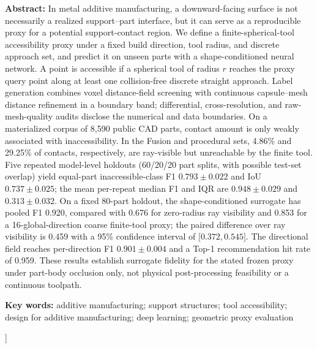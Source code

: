 \documentclass[UTF8,a4paper,twocolumn,zihao=5,fontset=fandol]{ctexart}
\begin{document}
\begin{@twocolumnfalse}
\begin{minipage}{\textwidth}
\vspace{0.45em}
\noindent\textbf{Abstract:}
In metal additive manufacturing, a downward-facing surface is not necessarily a realized support--part interface, but it can serve as a reproducible proxy for a potential support-contact region.
We define a finite-spherical-tool accessibility proxy under a fixed build direction, tool radius, and discrete approach set, and predict it on unseen parts with a shape-conditioned neural network.
A point is accessible if a spherical tool of radius $r$ reaches the proxy query point along at least one collision-free discrete straight approach.
Label generation combines voxel distance-field screening with continuous capsule--mesh distance refinement in a boundary band; differential, cross-resolution, and raw-mesh-quality audits disclose the numerical and data boundaries.
On a materialized corpus of 8,590 public CAD parts, contact amount is only weakly associated with inaccessibility.
In the Fusion and procedural sets, 4.86\% and 29.25\% of contacts, respectively, are ray-visible but unreachable by the finite tool.
Five repeated model-level holdouts (60/20/20 part splits, with possible test-set overlap) yield equal-part inaccessible-class F1 $0.793\pm0.022$ and IoU $0.737\pm0.025$; the mean per-repeat median F1 and IQR are $0.948\pm0.029$ and $0.313\pm0.032$.
On a fixed 80-part holdout, the shape-conditioned surrogate has pooled F1 0.920, compared with 0.676 for zero-radius ray visibility and 0.853 for a 16-global-direction coarse finite-tool proxy; the paired difference over ray visibility is 0.459 with a 95\% confidence interval of $\lbrack 0.372,0.545\rbrack$. The directional field reaches per-direction F1 $0.901\pm0.004$ and a Top-1 recommendation hit rate of 0.959.
These results establish surrogate fidelity for the stated frozen proxy under part-body occlusion only, not physical post-processing feasibility or a continuous toolpath.

\noindent\textbf{Key words:} additive manufacturing; support structures; tool accessibility; design for additive manufacturing; deep learning; geometric proxy evaluation
\end{minipage}
\vspace{0.7em}
\end{@twocolumnfalse}
]





\end{document}
